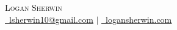 \documentclass[letterpaper,11pt]{article}
\newcommand\+{\raisebox{0.35ex}{\tiny +}}
\begin{document}
\begin{center}
  {\Huge \scshape Logan Sherwin} \\ \vspace{2pt}
  \href{mailto:lsherwin10@gmail.com}{\raisebox{-0.2\height}\  \underline{lsherwin10@gmail.com}} $|$
  \href{https://logansherwin.com/}{\raisebox{-0.2\height}\ \underline{logansherwin.com}}
  \vspace{-2pt}
\end{center}
\end{document}
